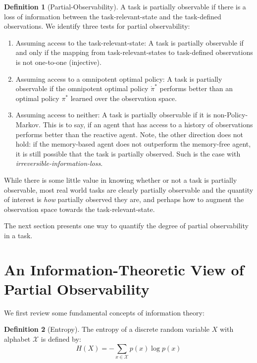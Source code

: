 \documentclass{article} %
\theoremstyle{definition}
\newtheorem{definition}{Definition}[section]
\begin{document}
\begin{definition}[Partial-Observability]
A task is partially observable if there is a loss of information
between the task-relevant-state and the task-defined observations. We
identify three tests for partial observability:
\begin{enumerate}
\item Assuming access to the task-relevant-state: A task
  is partially observable if and only if the mapping from
  task-relevant-states to task-defined observations is not
  one-to-one (injective).
\item Assuming access to a omnipotent optimal policy: A task is
  partially observable if the omnipotent optimal policy
  $\mathring{\pi}^*$ performs better than an optimal policy $\pi^*$
  learned over the observation space.
\item Assuming access to neither: A task is partially observable if it
  is non-Policy-Markov. This is to say, if an agent that has access to
  a history of observations performs better than the reactive
  agent. Note, the other direction does not hold: if the memory-based
  agent does not outperform the memory-free agent, it is still
  possible that the task is partially observed. Such is the case with
  \textit{irreversible-information-loss}.
\end{enumerate}

While there is some little value in knowing whether or not a task is
partially observable, most real world tasks are clearly partially
observable and the quantity of interest is \textit{how} partially
observed they are, and perhaps how to augment the observation space
towards the task-relevant-state.
\end{definition}

The next section presents one way to quantify the degree of partial
observability in a task.

\section{An Information-Theoretic View of Partial Observability}
We first review some fundamental concepts of information theory:

\begin{definition}[Entropy]
\label{def:entropy}
The entropy of a discrete random variable $X$ with alphabet $\mathcal{X}$ is
defined by:
\[
H(X) = -\sum_{x\in \mathcal{X}} p(x) \log p(x)
\]
\end{definition}
\end{document}
